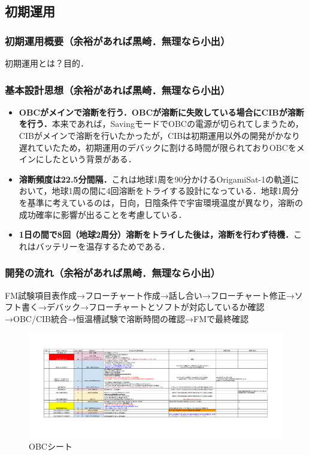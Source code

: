 
\subsection{初期運用}

\subsubsection{初期運用概要（余裕があれば黒崎．無理なら小出）}
初期運用とは？目的．

\subsubsection{基本設計思想（余裕があれば黒崎．無理なら小出）}
\begin{itemize}
	\item \textbf{OBCがメインで溶断を行う．OBCが溶断に失敗している場合にCIBが溶断を行う．}本来であれば，SavingモードでOBCの電源が切られてしまうため，CIBがメインで溶断を行いたかったが，CIBは初期運用以外の開発がかなり遅れていたため，初期運用のデバックに割ける時間が限られておりOBCをメインにしたという背景がある．
	\item \textbf{溶断頻度は22.5分間隔．}これは地球1周を90分かけるOrigamiSat-1の軌道において，地球1周の間に4回溶断をトライする設計になっている．地球1周分を基準に考えているのは，日向，日陰条件で宇宙環境温度が異なり，溶断の成功確率に影響が出ることを考慮している．
	\item \textbf{1日の間で8回（地球2周分）溶断をトライした後は，溶断を行わず待機．}これはバッテリーを温存するためである．
\end{itemize}

\subsubsection{開発の流れ（余裕があれば黒崎．無理なら小出）}
FM試験項目表作成→フローチャート作成→話し合い→フローチャート修正→ソフト書く→デバック→フローチャートとソフトが対応しているか確認→OBC/CIB統合→恒温槽試験で溶断時間の確認→FMで最終確認

\begin{figure}[H]
	\centering
	\includegraphics[scale=0.8,angle=90]{03/fig/3-4-Ini-1.pdf}
	\caption{OBCシート}
	\label{fig3-4-Ini-1}
\end{figure}

